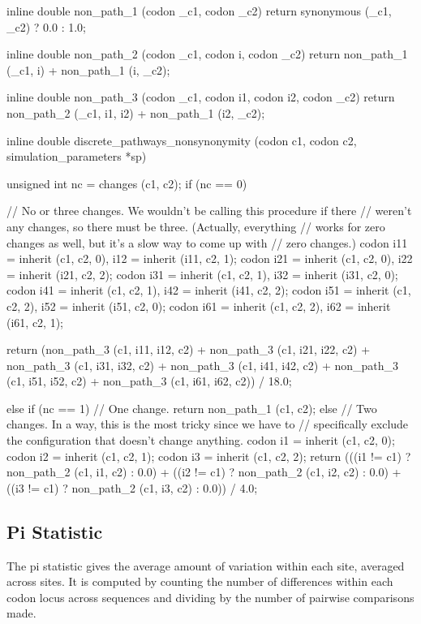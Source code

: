\documentclass{article}
\begin{document}
\begin{ccode}
inline double non_path_1 (codon _c1, codon _c2)
  {return synonymous (_c1, _c2) ? 0.0 : 1.0;}

inline double non_path_2 (codon _c1, codon i, codon _c2)
  {return non_path_1 (_c1, i) + non_path_1 (i, _c2);}

inline double non_path_3 (codon _c1, codon i1, codon i2, codon _c2)
  {return non_path_2 (_c1, i1, i2) + non_path_1 (i2, _c2);}

inline double discrete_pathways_nonsynonymity (codon c1, codon c2, simulation_parameters *sp) {
  unsigned int nc = changes (c1, c2);
  if (nc == 0) {
    // No or three changes. We wouldn’t be calling this procedure if there
    // weren’t any changes, so there must be three. (Actually, everything
    // works for zero changes as well, but it’s a slow way to come up with
    // zero changes.)
    codon i11 = inherit (c1, c2, 0), i12 = inherit (i11, c2, 1);
    codon i21 = inherit (c1, c2, 0), i22 = inherit (i21, c2, 2);
    codon i31 = inherit (c1, c2, 1), i32 = inherit (i31, c2, 0);
    codon i41 = inherit (c1, c2, 1), i42 = inherit (i41, c2, 2);
    codon i51 = inherit (c1, c2, 2), i52 = inherit (i51, c2, 0);
    codon i61 = inherit (c1, c2, 2), i62 = inherit (i61, c2, 1);

    return (non_path_3 (c1, i11, i12, c2) + non_path_3 (c1, i21, i22, c2) +
	    non_path_3 (c1, i31, i32, c2) + non_path_3 (c1, i41, i42, c2) +
	    non_path_3 (c1, i51, i52, c2) + non_path_3 (c1, i61, i62, c2)) / 18.0;
  } else if (nc == 1)
    // One change.
    return non_path_1 (c1, c2);
  else {
    // Two changes. In a way, this is the most tricky since we have to
    // specifically exclude the configuration that doesn’t change anything.
    codon i1 = inherit (c1, c2, 0);
    codon i2 = inherit (c1, c2, 1);
    codon i3 = inherit (c1, c2, 2);
    return (((i1 != c1) ? non_path_2 (c1, i1, c2) : 0.0) +
	    ((i2 != c1) ? non_path_2 (c1, i2, c2) : 0.0) +
	    ((i3 != c1) ? non_path_2 (c1, i3, c2) : 0.0)) / 4.0;
  }
}
\end{ccode}

    \subsection{Pi Statistic}
      \label{sec:pi-statistic}

      The pi statistic gives the average amount of variation within each site,
      averaged across sites. It is computed by counting the number of
      differences within each codon locus across sequences and dividing by the
      number of pairwise comparisons made.
\end{document}
